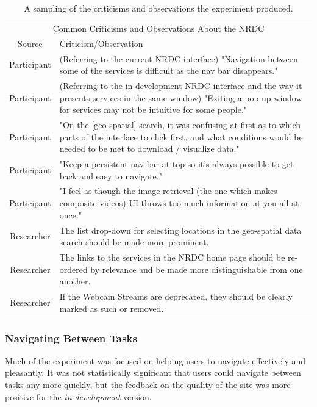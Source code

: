 \documentclass{article}
\begin{document}
\begin{table}[h]
    \centering
    \begin{tabular}{| c | p{9.5cm} |}
    \hline
    \multicolumn{2}{|c|}{Common Criticisms and Observations About the NRDC} \\
    Source & Criticism/Observation \\
    \hline
    \hline
    Participant & (Referring to the current NRDC interface) "Navigation between some of the services is difficult as the nav bar disappears." \\
    \hline
    Participant & (Referring to the in-development NRDC interface and the way it presents services in the same window) "Exiting a pop up window for services may not be intuitive for some people." \\
    \hline
    Participant & "On the [geo-spatial] search, it was confusing at first as to which parts of the interface to click first, and what conditions would be needed to be met to download / visualize data." \\
    \hline
    Participant & "Keep a persistent nav bar  at top so it's always possible to get back and easy to navigate." \\
    \hline
    Participant & "I feel as though the image retrieval (the one which makes composite videos) UI throws too much information at you all at once." \\
    \hline
    Researcher  & The list drop-down for selecting locations in the geo-spatial data search should be made more prominent. \\
    \hline
    Researcher  & The links to the services in the NRDC home page should be re-ordered by relevance and be made more distinguishable from one another. \\
    \hline
    Researcher  & If the Webcam Streams are deprecated, they should be clearly marked as such or removed. \\
    \hline
    \end{tabular}
    
    \caption{A sampling of the criticisms and observations the experiment produced.}
    \label{tab:criticisms_observations}
\end{table}

\subsubsection{Navigating Between Tasks}
Much of the experiment was focused on helping users to navigate effectively and pleasantly. It was not statistically significant that users could navigate between tasks any more quickly, but the feedback on the quality of the site was more positive for the \emph{in-development} version.
\end{document}
